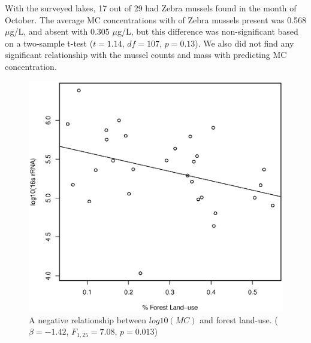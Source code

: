 With the surveyed lakes, 17 out of 29 had Zebra mussels found in the month of October. The average MC concentrations with  of Zebra mussels present was 0.568 $\mu$g/L, and absent with 0.305 $\mu$g/L, but this difference was non-significant based on a two-sample t-test ($t=1.14$, $df=107$, $p=0.13$). We also did not find any significant relationship with the mussel counts and mass with predicting MC concentration.


\begin{figure}[p]
	\includegraphics[width=\textwidth]{figures/forest}
	\caption{
A negative relationship between $log10(MC)$ and forest land-use. ($\beta=-1.42$, $F_{{1,25}}=7.08$, $p=0.013$)
}
	\label{fig:forest}
\end{figure}





